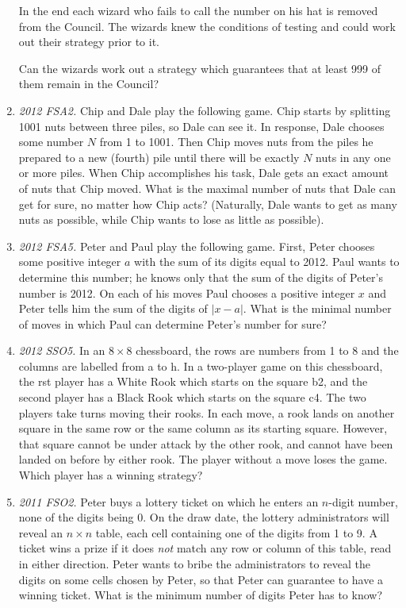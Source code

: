 \documentclass[11pt,a4paper]{article}
\begin{document}
\begin{enumerate}
In the end each wizard who fails to call the number on his hat is removed from the Council.  The
wizards knew the conditions of testing and could work out their strategy prior to it.

Can the wizards work out a strategy which guarantees that at least 999 of them remain
in the Council?

\item\emph {2012 FSA2.} Chip and Dale play the following game. Chip starts by splitting 1001 nuts between three piles, so Dale can see it. In response, Dale chooses some number $N$ from 1 to 1001. Then Chip moves nuts from the piles he prepared to a new (fourth) pile until there will be exactly $N$ nuts in any one or more piles.  When Chip accomplishes his task, Dale gets an exact amount of nuts that Chip moved. What is the maximal number of nuts that Dale can get for sure, no matter how Chip acts? (Naturally, Dale wants to get as many nuts as possible, while Chip wants to lose as little as possible).

\item\emph {2012 FSA5.} Peter and Paul play the following game. First, Peter chooses some positive integer $a$
with
the sum of its digits equal to 2012. Paul wants to determine this number; he knows only that the sum of the digits of Peter’s number is 2012. On each of his moves Paul chooses a positive integer $x$ and Peter tells him the sum of the digits of
$|x-a|$. What is the minimal number of moves in which Paul can determine Peter’s number for sure?

\item\emph {2012 SSO5.} In an $8\times 8$ chessboard, the rows are numbers from 1 to 8 and the columns are labelled from a
to h.  In a two-player game on this chessboard, the  rst player has a White Rook which starts
on the square b2, and the second player has a Black Rook which starts on the square c4.  The
two  players  take  turns  moving  their  rooks.   In  each  move,  a  rook  lands  on  another  square
in the same row or the same column as its starting square.  However, that square cannot be
under attack by the other rook, and cannot have been landed on before by either rook.  The
player without a move loses the game.  Which player has a winning strategy?

\item\emph {2011 FSO2.} Peter buys a lottery ticket on which he enters an $n$-digit number, none of the digits being 0. On the draw date, the lottery administrators will reveal an $n\times n$ table, each cell containing one of the digits from 1 to 9.  A ticket wins a prize if it does \emph{not} match any row or column of this table, read in either direction.  Peter wants to bribe the administrators to reveal the digits on some cells chosen by Peter, so that Peter can guarantee to have a winning ticket.
What is the minimum number of digits Peter has to know?


\end{enumerate}
\end{document}

